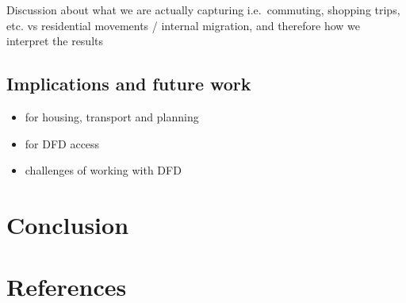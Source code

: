 \documentclass[
  10pt,
  letterpaper,
  DIV=11,
  numbers=noendperiod]{scrartcl}
\begin{document}
Discussion about what we are actually capturing i.e.~commuting, shopping
trips, etc. vs residential movements / internal migration, and therefore
how we interpret the results

\hypertarget{implications-and-future-work}{%
\subsection{Implications and future
work}\label{implications-and-future-work}}

\begin{itemize}
\item
  for housing, transport and planning
\item
  for DFD access
\item
  challenges of working with DFD
\end{itemize}

\hypertarget{conclusion}{%
\section{Conclusion}\label{conclusion}}

\hypertarget{references}{%
\section*{References}\label{references}}
\end{document}
